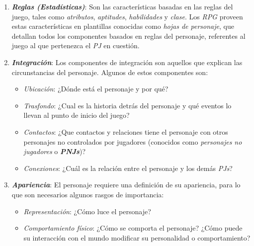 \begin{enumerate}
    
    \item \textbf{\textit{Reglas (Estadísticas)}}: Son las características basadas en las reglas del juego, tales como 
    \textit{atributos}, \textit{aptitudes}, \textit{habilidades} y \textit{clase}. Los \textit{RPG} proveen estas 
    características en plantillas conocidas como \textit{hojas de personaje}, que detallan todos los componentes 
    basados en reglas del personaje, referentes al juego al que pertenezca el \textit{PJ} en cuestión.

    \item \textbf{\textit{Integración}}: Los componentes de integración son aquellos que explican las 
    circunstancias del personaje. Algunos de estos componentes son:

    \begin{itemize}
        
        \item \textit{Ubicación}: ¿Dónde está el personaje y por qué?
        
        \item \textit{Trasfondo}: ¿Cual es la historia detrás del personaje y qué eventos lo llevan al 
        punto de inicio del juego?

        \item \textit{Contactos}: ¿Que contactos y relaciones tiene el personaje con otros personajes no controlados por 
        jugadores (conocidos como \textit{personajes no jugadores} o \textbf{\textit{PNJs}})?

        \item \textit{Conexiones}: ¿Cuál es la relación entre el personaje y los demás \textit{PJs}?
        
    \end{itemize}
    
    \item \textbf{\textit{Apariencia}}: El personaje requiere una definición de su apariencia, para lo que son necesarios 
    algunos rasgos de importancia:

    \begin{itemize}

        \item \textit{Representación}: ¿Cómo luce el personaje?
    
        \item \textit{Comportamiento físico}: ¿Cómo se comporta el personaje? ¿Cómo puede su interacción con el mundo 
        modificar su personalidad o comportamiento?
        

\end{itemize}
\end{enumerate}
